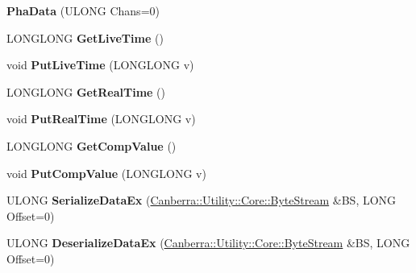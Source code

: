 \begin{DoxyCompactItemize}
\item 
\mbox{\label{class_canberra_1_1_data_types_1_1_spectroscopy_1_1_pha_data_a6788b013e2ed8c96be20b3115c91aaf5}} 
{\bfseries Pha\+Data} (U\+L\+O\+NG Chans=0)
\item 
\mbox{\label{class_canberra_1_1_data_types_1_1_spectroscopy_1_1_pha_data_a0c54421308d4a554547f793ff8713549}} 
L\+O\+N\+G\+L\+O\+NG {\bfseries Get\+Live\+Time} ()
\item 
\mbox{\label{class_canberra_1_1_data_types_1_1_spectroscopy_1_1_pha_data_adff70efc8be8bbc03ed9d3dd15565d60}} 
void {\bfseries Put\+Live\+Time} (L\+O\+N\+G\+L\+O\+NG v)
\item 
\mbox{\label{class_canberra_1_1_data_types_1_1_spectroscopy_1_1_pha_data_a05d3eacdc34039f54d1285b39ff2f6f3}} 
L\+O\+N\+G\+L\+O\+NG {\bfseries Get\+Real\+Time} ()
\item 
\mbox{\label{class_canberra_1_1_data_types_1_1_spectroscopy_1_1_pha_data_aee546fc4f1be57f41ce42e156bdb0cd9}} 
void {\bfseries Put\+Real\+Time} (L\+O\+N\+G\+L\+O\+NG v)
\item 
\mbox{\label{class_canberra_1_1_data_types_1_1_spectroscopy_1_1_pha_data_a837f4a6f2add83b9fa2e3a8daedb64ad}} 
L\+O\+N\+G\+L\+O\+NG {\bfseries Get\+Comp\+Value} ()
\item 
\mbox{\label{class_canberra_1_1_data_types_1_1_spectroscopy_1_1_pha_data_ac36f20d9ff2b85abb273dee875eb3ee7}} 
void {\bfseries Put\+Comp\+Value} (L\+O\+N\+G\+L\+O\+NG v)
\item 
\mbox{\label{class_canberra_1_1_data_types_1_1_spectroscopy_1_1_pha_data_a8342022221d260296876a3c7ea5723c8}} 
U\+L\+O\+NG {\bfseries Serialize\+Data\+Ex} (\hyperlink{class_canberra_1_1_utility_1_1_core_1_1_byte_stream}{Canberra\+::\+Utility\+::\+Core\+::\+Byte\+Stream} \&BS, L\+O\+NG Offset=0)
\item 
\mbox{\label{class_canberra_1_1_data_types_1_1_spectroscopy_1_1_pha_data_a2c06376587069a48f74980c08123af9e}} 
U\+L\+O\+NG {\bfseries Deserialize\+Data\+Ex} (\hyperlink{class_canberra_1_1_utility_1_1_core_1_1_byte_stream}{Canberra\+::\+Utility\+::\+Core\+::\+Byte\+Stream} \&BS, L\+O\+NG Offset=0)
\end{DoxyCompactItemize}
